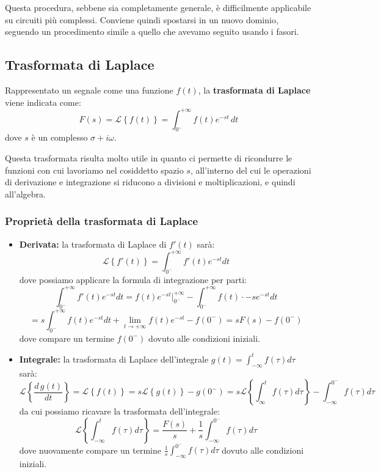 \documentclass[a4paper,11pt]{article}
\begin{document}
Questa procedura, sebbene sia completamente generale, è difficilmente applicabile su circuiti più complessi.
Conviene quindi spostarsi in un nuovo dominio, seguendo un procedimento simile a quello che avevamo seguito usando i fasori.

\subsection{Trasformata di Laplace}
Rappresentato un segnale come una funzione $f(t)$, la \textbf{trasformata di Laplace} viene indicata come:
$$
F(s) = \mathcal{L} \left\{ f(t) \right\} = \int_{0^-}^{+\infty} f(t)e^{-st} \, dt
$$
dove $s$ è un complesso $\sigma + i \omega$.

Questa trasformata risulta molto utile in quanto ci permette di ricondurre le funzioni con cui lavoriamo nel cosiddetto spazio $s$, all'interno del cui le operazioni di derivazione e integrazione si riducono a divisioni e moltiplicazioni, e quindi all'algebra.

\subsubsection{Proprietà della trasformata di Laplace}

\begin{itemize}
	\item \textbf{Derivata:} la trasformata di Laplace di $f'(t)$ sarà:
		$$
		\mathcal{L}\left\{ f'(t) \right\} = \int_{0^-}^{+\infty} f'(t) e^{-st} dt	
		$$
		dove possiamo applicare la formula di integrazione per parti:
		$$ 
		\int_{0^-}^{+\infty} f'(t) e^{-st} dt = f(t) e^{-st} \Big|_{0^-}^{+\infty} - \int_{0^-}^{+\infty} f(t) \cdot -s e^{-st} dt 
		$$
		$$
		= s \int_{0^-}^{+\infty} f(t) e^{-st} dt + \lim_{t \rightarrow +\infty} f(t)e^{-st} - f(0^-) = s F(s) - f(0^-)
		$$
		dove compare un termine $f(0^-)$ dovuto alle condizioni iniziali.
\item \textbf{Integrale:} la trasformata di Laplace dell'integrale $g(t) = \int_{-\infty}^t f(\tau) d\tau$ sarà:
		$$
		\mathcal{L}\left\{ \frac{d\,g(t)}{dt} \right\} = \mathcal{L}\left\{ f(t) \right\} = s \mathcal{L}\left\{ g(t) \right\} - g(0^-) =  s \mathcal{L}\left\{ \int_\infty^t f(\tau) d\tau \right\} - \int_{-\infty}^{0^-} f(\tau) d\tau
		$$
		da cui possiamo ricavare la trasformata dell'integrale:
		$$
		\mathcal{L}\left\{ \int_{-\infty}^t f(\tau) d\tau \right\} = \frac{F(s)}{s} + \frac{1}{s} \int_{-\infty}^{0^-} f(\tau) d \tau
		$$
dove nuovamente compare un termine $\frac{1}{s} \int_{-\infty}^{0^-} f(\tau) d \tau$ dovuto alle condizioni iniziali.
\end{itemize}
\end{document}
